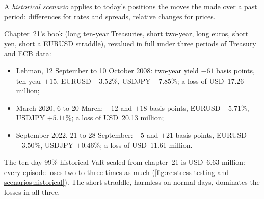 \begin{definition}\label{def:rc:stress-testing-and-scenarios:historical}
A \emph{historical scenario} applies to today's positions the moves
the  made over a past period: differences for rates and spreads, relative changes
for prices.
\end{definition}

\begin{example}\label{ex:rc:stress-testing-and-scenarios:historical}
Chapter~21's book (long ten-year Treasuries, short two-year, long euros, short yen, short a
EURUSD straddle), revalued in full under three periods of Treasury and ECB data:
\begin{itemize}
\item Lehman, 12 September to 10 October 2008: two-year yield $-61$ basis points, ten-year $+15$,
EURUSD $-3.52\%$, USDJPY $-7.85\%$; a loss of USD~17.26 million;
\item March 2020, 6 to 20 March: $-12$ and $+18$ basis points, EURUSD $-5.71\%$, USDJPY $+5.11\%$; a
loss of USD~20.13 million;
\item September 2022, 21 to 28 September: $+5$ and $+21$ basis points, EURUSD $-3.50\%$, USDJPY
$+0.46\%$; a loss of USD~11.61 million.
\end{itemize}
The ten-day 99\% historical VaR scaled from chapter~21 is USD~6.63 million: every episode loses two
to three times as much (\cref{fig:rc:stress-testing-and-scenarios:historical}). The short straddle,
harmless on normal days, dominates the losses in all three.
\end{example}

\begin{omfigure}

\label{fig:rc:stress-testing-and-scenarios:historical}
\end{omfigure}

